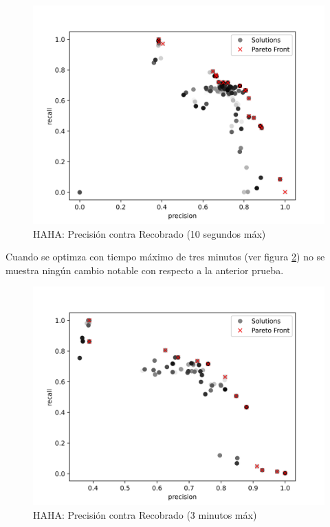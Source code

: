 \begin{figure}[ht]
    \centering
    \includegraphics[scale=0.65]{Pictures/haha_precision_vs_recall.jpg}
    \caption{HAHA: Precisi\'on contra Recobrado (10 segundos m\'ax)}
    \label{impl:fig:haha:precision_vs_recall}
\end{figure}

Cuando se optimza con tiempo m\'aximo de tres minutos (ver figura \ref{impl:fig:haha:precision_vs_recall_3min}) no se muestra ning\'un cambio notable con respecto a la anterior prueba. 

\begin{figure}[ht]
    \centering
    \includegraphics[scale=0.65]{Pictures/haha_precision_vs_recall_3min.jpg}
    \caption{HAHA: Precisi\'on contra Recobrado (3 minutos m\'ax)}
    \label{impl:fig:haha:precision_vs_recall_3min}
\end{figure}

